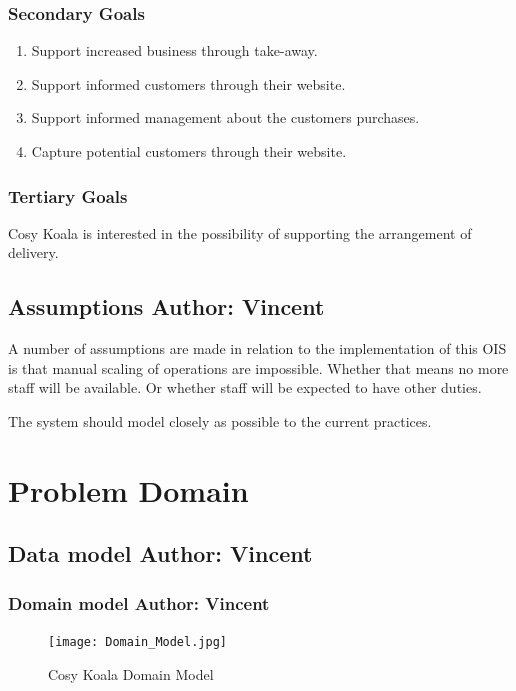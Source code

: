 \documentclass{article}
\begin{document}
\subsubsection{Secondary Goals}
\begin{enumerate}
    \item Support increased business through take-away.
    \item Support informed customers through their website.
    \item Support informed management about the customers purchases.
    \item Capture potential customers through their website.
\end{enumerate}
\subsubsection{Tertiary Goals}
Cosy Koala is interested in the possibility of supporting the arrangement of delivery.

\subsection{Assumptions \normalsize\textbf{Author: Vincent}}
A number of assumptions are made in relation to the implementation of this OIS is that manual scaling of operations are impossible. Whether that means no more staff will be available. Or whether staff will be expected to have other duties.

The system should model closely as possible to the current practices.


\clearpage

\section{Problem Domain}

\subsection{Data model \normalsize\textbf{Author: Vincent}}
\subsubsection{Domain model \normalsize\textbf{Author: Vincent}}
\begin{figure}[!ht]
    \centering
    \texttt{[image: Domain\_Model.jpg]}
    \caption{Cosy Koala Domain Model}
    \label{fig:Domain_Model}
\end{figure}
\end{document}
